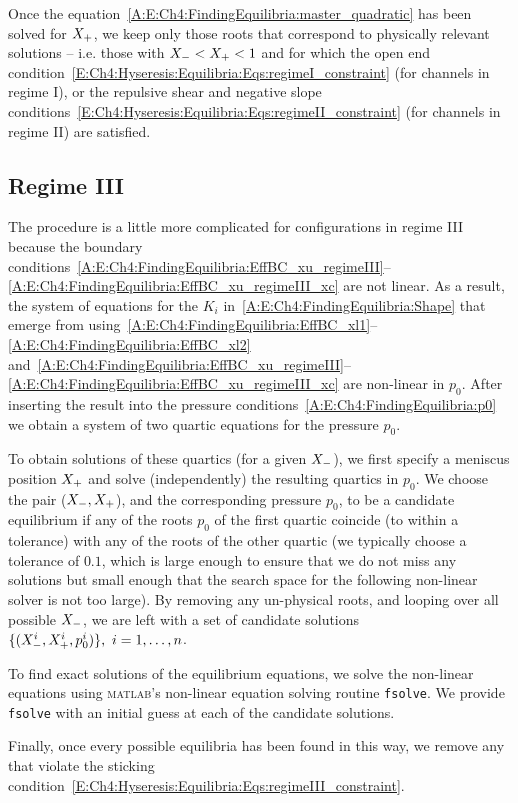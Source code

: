 \begin{subappendices}
Once the equation~\eqref{A:E:Ch4:FindingEquilibria:master_quadratic} has been solved for $X_{+}$, we keep only those roots that correspond to physically relevant solutions -- i.e. those with $X_{-} < X_{+} < 1$ and for which the open end condition~\eqref{E:Ch4:Hyseresis:Equilibria:Eqs:regimeI_constraint} (for channels in regime I), or the repulsive shear and negative slope conditions~\eqref{E:Ch4:Hyseresis:Equilibria:Eqs:regimeII_constraint} (for channels in regime II) are satisfied.

\subsection{Regime III}
The procedure is a little more complicated for configurations in regime III because the boundary conditions~\eqref{A:E:Ch4:FindingEquilibria:EffBC_xu_regimeIII}--\eqref{A:E:Ch4:FindingEquilibria:EffBC_xu_regimeIII_xc} are not linear. As a result, the system of equations for the $K_i$ in~\eqref{A:E:Ch4:FindingEquilibria:Shape} that emerge from  using~\eqref{A:E:Ch4:FindingEquilibria:EffBC_xl1}--\eqref{A:E:Ch4:FindingEquilibria:EffBC_xl2} and~\eqref{A:E:Ch4:FindingEquilibria:EffBC_xu_regimeIII}--\eqref{A:E:Ch4:FindingEquilibria:EffBC_xu_regimeIII_xc} are non-linear in $p_0$. After inserting the result  into the pressure conditions~\eqref{A:E:Ch4:FindingEquilibria:p0} we obtain a system of two quartic equations for the pressure $p_0$.

To obtain solutions of these quartics (for a given $X_{-}$), we first specify a meniscus position $X_{+}$ and solve (independently) the resulting quartics in $p_0$. We choose the pair ($X_{-}, X_{+}$), and the corresponding pressure $p_0$, to be a candidate equilibrium if any of the roots $p_0$ of the first quartic coincide (to within a tolerance) with any of the roots of the other quartic (we typically choose a tolerance of $0.1$, which is large enough to ensure that we do not miss any solutions but small enough that the search space for the following non-linear solver is not too large). By removing any un-physical roots, and looping over all possible $X_{-}$, we are left with a set of candidate solutions $\{(X_{-}^i, X_{+}^i, p_0^i)\}, ~i =1,\dots, n$.

To find exact solutions of the equilibrium equations, we solve the non-linear equations using \textsc{matlab}'s non-linear equation solving routine \texttt{fsolve}. We provide \texttt{fsolve} with an initial guess at each of the candidate solutions.

Finally, once every possible equilibria has been found in this way, we remove any that violate the sticking condition~\eqref{E:Ch4:Hyseresis:Equilibria:Eqs:regimeIII_constraint}.


\end{subappendices}
